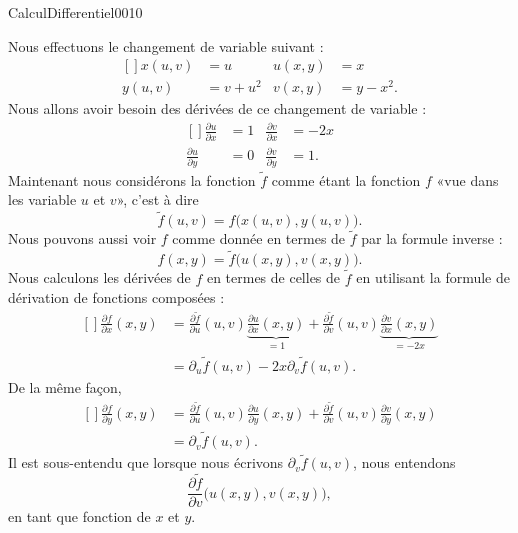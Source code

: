 \begin{corrige}{CalculDifferentiel0010}

	Nous effectuons le changement de variable suivant :
	\begin{equation}
		\begin{aligned}[]
			x(u,v)&=u&u(x,y)&=x\\
			y(u,v)&=v+u^2&v(x,y)&=y-x^2.
		\end{aligned}
	\end{equation}
	Nous allons avoir besoin des dérivées de ce changement de variable :
	\begin{equation}
		\begin{aligned}[]
			\frac{ \partial u }{ \partial x }&=1&\frac{ \partial v }{ \partial x }&=-2x\\
			\frac{ \partial u }{ \partial y }&=0&\frac{ \partial v }{ \partial y }&=1.
		\end{aligned}
	\end{equation}
	Maintenant nous considérons la fonction $\tilde f$ comme étant la fonction $f$ «vue dans les variable $u$ et $v$», c'est à dire
	\begin{equation}
		\tilde f(u,v)=f\big( x(u,v),y(u,v) \big).
	\end{equation}
	Nous pouvons aussi voir $f$ comme donnée en termes de $\tilde f$ par la formule inverse :
	\begin{equation}
		f(x,y)=\tilde f\big( u(x,y),v(x,y) \big).
	\end{equation}
	Nous calculons les dérivées de $f$ en termes de celles de $\tilde f$ en utilisant la formule de dérivation de fonctions composées :
	\begin{equation}
		\begin{aligned}[]
			\frac{ \partial f }{ \partial x }(x,y)&=\frac{ \partial \tilde f }{ \partial u }(u,v)\underbrace{\frac{ \partial u }{ \partial x }(x,y)}_{=1}+\frac{ \partial \tilde f }{ \partial v }(u,v)\underbrace{\frac{ \partial v }{ \partial x }(x,y)}_{=-2x}\\
			&=\partial_u\tilde f(u,v)-2x\partial_v\tilde f(u,v).
		\end{aligned}
	\end{equation}
	De la même façon,
	\begin{equation}
		\begin{aligned}[]
			\frac{ \partial f }{ \partial y }(x,y)&=\frac{ \partial \tilde f }{ \partial u }(u,v)\frac{ \partial u }{ \partial y }(x,y)+\frac{ \partial \tilde f }{ \partial v }(u,v)\frac{ \partial v }{ \partial y }(x,y)\\
			&=\partial_v\tilde f(u,v).
		\end{aligned}
	\end{equation}
	Il est sous-entendu que lorsque nous écrivons $\partial_v\tilde f(u,v)$, nous entendons
	\begin{equation}
		\frac{ \partial \tilde f }{ \partial v }\big( u(x,y),v(x,y) \big),
	\end{equation}
	en tant que fonction de $x$ et $y$.


\end{corrige}
